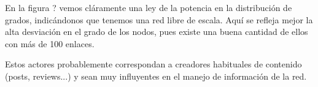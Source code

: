 En la figura ? vemos cláramente una ley de la potencia en la distribución de grados, indicándonos que tenemos una red libre de escala. Aquí se refleja mejor la alta desviación en el grado de los nodos, pues existe una buena cantidad de ellos con más de 100 enlaces.

Estos actores probablemente correspondan a creadores habituales de contenido (posts, reviews...) y sean muy influyentes en el manejo de información de la red.